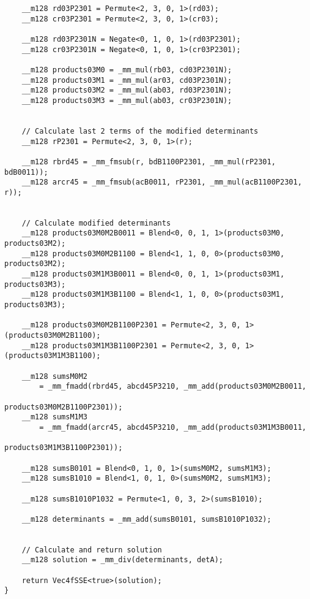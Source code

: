 \begin{verbatim}
    __m128 rd03P2301 = Permute<2, 3, 0, 1>(rd03);
    __m128 cr03P2301 = Permute<2, 3, 0, 1>(cr03);

    __m128 rd03P2301N = Negate<0, 1, 0, 1>(rd03P2301);
    __m128 cr03P2301N = Negate<0, 1, 0, 1>(cr03P2301);

    __m128 products03M0 = _mm_mul(rb03, cd03P2301N);
    __m128 products03M1 = _mm_mul(ar03, cd03P2301N);
    __m128 products03M2 = _mm_mul(ab03, rd03P2301N);
    __m128 products03M3 = _mm_mul(ab03, cr03P2301N);


    // Calculate last 2 terms of the modified determinants
    __m128 rP2301 = Permute<2, 3, 0, 1>(r);

    __m128 rbrd45 = _mm_fmsub(r, bdB1100P2301, _mm_mul(rP2301, bdB0011));
    __m128 arcr45 = _mm_fmsub(acB0011, rP2301, _mm_mul(acB1100P2301, r));


    // Calculate modified determinants
    __m128 products03M0M2B0011 = Blend<0, 0, 1, 1>(products03M0, products03M2);
    __m128 products03M0M2B1100 = Blend<1, 1, 0, 0>(products03M0, products03M2);
    __m128 products03M1M3B0011 = Blend<0, 0, 1, 1>(products03M1, products03M3);
    __m128 products03M1M3B1100 = Blend<1, 1, 0, 0>(products03M1, products03M3);

    __m128 products03M0M2B1100P2301 = Permute<2, 3, 0, 1>(products03M0M2B1100);
    __m128 products03M1M3B1100P2301 = Permute<2, 3, 0, 1>(products03M1M3B1100);

    __m128 sumsM0M2 
        = _mm_fmadd(rbrd45, abcd45P3210, _mm_add(products03M0M2B0011, 
                                                 products03M0M2B1100P2301));
    __m128 sumsM1M3 
        = _mm_fmadd(arcr45, abcd45P3210, _mm_add(products03M1M3B0011, 
                                                 products03M1M3B1100P2301));

    __m128 sumsB0101 = Blend<0, 1, 0, 1>(sumsM0M2, sumsM1M3);
    __m128 sumsB1010 = Blend<1, 0, 1, 0>(sumsM0M2, sumsM1M3);

    __m128 sumsB1010P1032 = Permute<1, 0, 3, 2>(sumsB1010);

    __m128 determinants = _mm_add(sumsB0101, sumsB1010P1032);


    // Calculate and return solution
    __m128 solution = _mm_div(determinants, detA);

    return Vec4fSSE<true>(solution);
}
\end{verbatim}




\newpage
